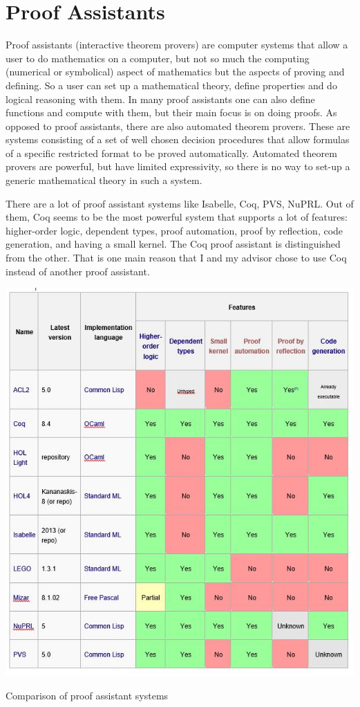 \section {Proof Assistants}
Proof assistants (interactive theorem provers) are computer systems that allow a user to do mathematics on a computer, but not so much the computing (numerical or symbolical) aspect of mathematics but the aspects of proving and defining. So a user can set up a mathematical theory, define properties and do logical reasoning with them. In many proof assistants one can also define functions and compute with them, but their main focus is on doing proofs. As opposed to proof assistants, there are also automated theorem provers. These are systems consisting of a set of well chosen decision procedures that allow formulas of a specific restricted format to be proved automatically. Automated theorem provers are powerful, but have limited expressivity, so there is no way to set-up a generic mathematical theory in such a system.

There are a lot of proof assistant systems like Isabelle, Coq, PVS, NuPRL. Out of them, Coq seems to be the most powerful system that supports a lot of features: higher-order logic, dependent types, proof automation, proof by reflection, code generation, and having a small kernel. The Coq proof assistant is distinguished from the other. That is one main reason that I and my advisor chose to use Coq instead of another proof assistant.
\begin{table}
\includegraphics[scale=0.8]{ProofAssistant.jpg}
\caption{Comparison of proof assistant systems}
\end{table}

